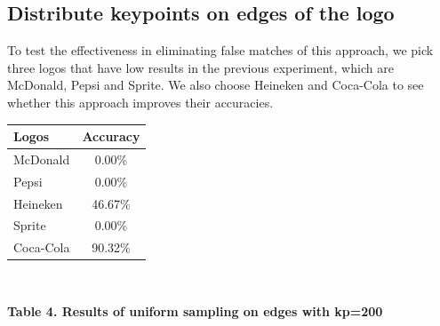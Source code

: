 \documentclass[letterpaper, 10 pt, conference]{ieeeconf}  %
\begin{document}
\subsection{Distribute keypoints on edges of the logo}
To test the effectiveness in eliminating false matches of this approach, we pick three logos that have low results in the previous experiment, which are McDonald, Pepsi and Sprite. We also choose Heineken and Coca-Cola to see whether this approach improves their accuracies. \par
\begin{center}
\begin{tabular}{|l|c|}
\hline
Logos & Accuracy\\ \hline
McDonald & 0.00\% \\ \hline
Pepsi & 0.00\% \\ \hline
Heineken & 46.67\% \\ \hline
Sprite & 0.00\% \\ \hline
Coca-Cola & 90.32\% \\ \hline
\end{tabular}
\\
\end{center}
\begin{center}
\textbf{Table 4. Results of uniform sampling on edges with kp=200}
\end{center}
\end{document}
